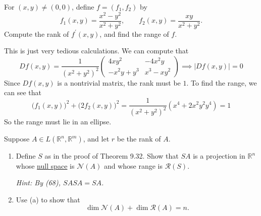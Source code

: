 	\begin{exercise}[Rudin 9.24]
		For $(x,y)\neq(0,0)$, define $f=(f_1,f_2)$ by
		\begin{equation}
			f_1(x,y)=\frac{x^2-y^2}{x^2+y^2},
			\qquad
			f_2(x,y)=\frac{xy}{x^2+y^2}.
		\end{equation}
		Compute the rank of $f^\prime(x,y)$, and find the range of $f$.
	\end{exercise}
	\begin{solution}
	  This is just very tedious calculations. We can compute that 
		\begin{equation}
			Df(x, y) = \frac{1}{(x^2 + y^2)^2} \begin{pmatrix} 
				4xy^2 & -4x^2 y \\ 
				-x^2 y + y^3 & x^3 - xy^2 
			\end{pmatrix} \implies |Df(x, y)| = 0
		\end{equation}
		Since $Df(x, y)$ is a nontrivial matrix, the rank must be $1$. To find the range, we can see that 
		\begin{equation}
			\big(f_1 (x, y)\big)^2 + \big( 2 f_2 (x, y)\big)^2 = \frac{1}{(x^2 + y^2)^2} (x^4 + 2x^2 y^2 y^4) = 1
		\end{equation}
		So the range must lie in an ellipse. 
	\end{solution}

	\begin{exercise}[Rudin 9.25]
		Suppose $A\in L(\mathbb{R}^n,\mathbb{R}^m)$, and let $r$ be the rank of $A$.

		\begin{enumerate}[label=(\alph*)]
			\item Define $S$ as in the proof of Theorem 9.32. Show that $SA$ is a projection in $\mathbb{R}^n$ whose \hyperref[lin-def:null-space]{null space} is $\mathscr{N}(A)$ and whose range is $\mathscr{R}(S)$.

			\textit{Hint: By (68), $SASA=SA$.}

			\item Use (a) to show that
			\begin{equation}
				\dim\mathscr{N}(A)+\dim\mathscr{R}(A)=n.
			\end{equation}
		\end{enumerate}
	\end{exercise}

